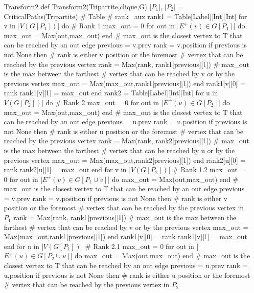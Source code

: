 \begin{code}{Transform2}
def Transform2(Tripartite,clique,G)
  |$P_1$|, |$P_2$| = CriticalPaths(Tripartite)
  # Table
  # rank \ aux
  rank1 = Table[Label][Int][Int]
  for v in |$V(G[P_1])$| do # Rank 1
    max_out = 0
    for out in |$E^+(v) \in G[P_1]$| do
      max_out = Max(out,max_out)
    end # max_out is the closest vertex to T that can be reached by an out edge
    previous = v.prev
    rank = v.position
    if previous is not None then
      # rank is either v position or the foremost
      # vertex that can be reached by the previous vertex
      rank = Max(rank, rank1[previous][1])
      # max_out is the max between the farthest
      # vertex that can be reached by v or by the previous vertex
      max_out = Max(max_out,rank1[previous][1])
    end
    rank1[v][0] = rank
    rank1[v][1] = max_out
  end
  rank2 = Table[Label][Int][Int]
  for u in |$V(G[P_2])$| do # Rank 2
    max_out = 0
    for out in |$E^+(u) \in G[P_2]$| do
      max_out = Max(out,max_out)
    end # max_out is the closest vertex to T that can be reached by an out edge
    previous = u.prev
    rank = u.position
    if previous is not None then
      # rank is either u position or the foremost
      # vertex that can be reached by the previous vertex
      rank = Max(rank, rank2[previous][1])
      # max_out is the max between the farthest
      # vertex that can be reached by u or by the previous vertex
      max_out = Max(max_out,rank2[previous][1])
    end
    rank2[u][0] = rank
    rank2[u][1] = max_out
  end
  for v in |$V(G[P_2])$| # Rank 1.2
    max_out = 0
    for out in |$E^+(v) \in G[P_1 \cup v]$| do
      max_out = Max(out,max_out)
    end # max_out is the closest vertex to T that can be reached by an out edge
    previous = v.prev
    rank = v.position
    if previous is not None then
      # rank is either v position or the foremost
      # vertex that can be reached by the previous vertex in $P_1$
      rank = Max(rank, rank1[previous][1])
      # max_out is the max between the farthest
      # vertex that can be reached by v or by the previous vertex
      max_out = Max(max_out,rank1[previous][1])
    end
    rank1[v][0] = rank
    rank1[v][1] = max_out
  end
  for u in |$V(G[P_1])$| # Rank 2.1
    max_out = 0
    for out in |$E^+(u) \in G[P_2 \cup u]$| do
      max_out = Max(out,max_out)
    end # max_out is the closest vertex to T that can be reached by an out edge
    previous = u.prev
    rank = u.position
    if previous is not None then
      # rank is either u position or the foremost
      # vertex that can be reached by the previous vertex in $P_2$

\end{code}

